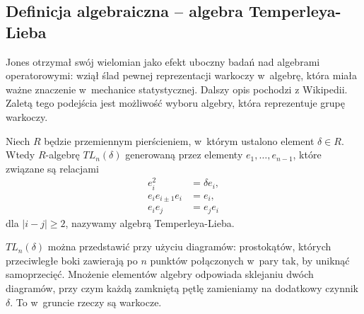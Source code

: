 \subsection{Definicja algebraiczna -- algebra Temperleya-Lieba} %
\label{sub:jones_paper}
Jones otrzymał swój wielomian jako efekt uboczny badań nad algebrami operatorowymi: wziął ślad pewnej reprezentacji warkoczy w~algebrę, która miała ważne znaczenie w~mechanice statystycznej.
Dalszy opis pochodzi z Wikipedii.
Zaletą tego podejścia jest możliwość wyboru algebry, która reprezentuje grupę warkoczy.

\begin{definition}
    Niech $R$ będzie przemiennym pierścieniem, w~którym ustalono element $\delta \in R$.
    Wtedy $R$-algebrę $TL_n(\delta)$ generowaną przez elementy $e_1, \ldots, e_{n-1}$, które związane są relacjami
    \begin{align}
        e_i^2 & = \delta e_i, \\
        e_i e_{i \pm 1} e_i & = e_i, \\
        e_i e_j & = e_j e_i
    \end{align}
    dla $|i-j| \ge 2$, nazywamy algebrą Temperleya-Lieba.
\end{definition}

$TL_n(\delta)$ można przedstawić przy użyciu diagramów: prostokątów, których przeciwległe boki zawierają po $n$ punktów połączonych w~pary tak, by uniknąć samoprzecięć.
Mnożenie elementów algebry odpowiada sklejaniu dwóch diagramów, przy czym każdą zamkniętą pętlę zamieniamy na dodatkowy czynnik $\delta$.
To w~gruncie rzeczy są warkocze.

